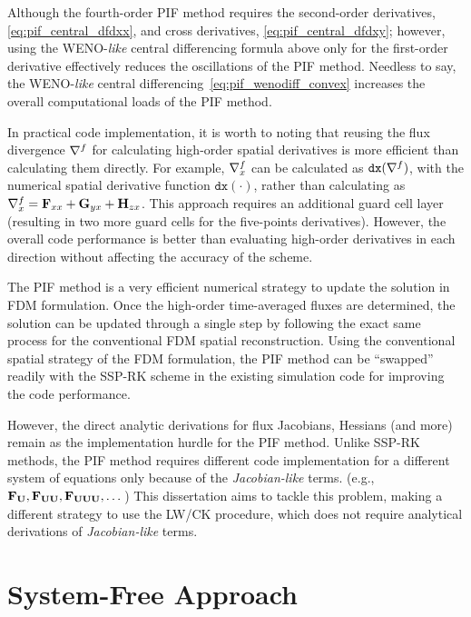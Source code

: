 Although the fourth-order PIF method requires the second-order derivatives, \cref{eq:pif_central_dfdxx},
and cross derivatives, \cref{eq:pif_central_dfdxy}; however, using the WENO-\textit{like}
central differencing formula above only for the first-order derivative
effectively reduces the oscillations of the PIF method.
Needless to say, the WENO-\textit{like} central differencing~\cref{eq:pif_wenodiff_convex}
increases the overall computational loads of the PIF method.

In practical code implementation, it is worth to noting that reusing the flux divergence \( \nabla^{f} \)
for calculating high-order spatial derivatives is more efficient than calculating them directly.
For example, \( \nabla^{f}_{x} \) can be calculated as \( \texttt{dx}(\nabla^{f}) \),
with the numerical spatial derivative function \( \texttt{dx}(\cdot) \),
rather than calculating as \( \nabla^{f}_{x} = \mathbf{F}_{xx} + \mathbf{G}_{yx}+ \mathbf{H}_{zx} \).
This approach requires an additional guard cell layer
(resulting in two more guard cells for the five-points derivatives).
However, the overall code performance is better than
evaluating high-order derivatives in each direction without affecting the accuracy of the scheme.

The PIF method is a very efficient numerical strategy to update the solution in FDM formulation.
Once the high-order time-averaged fluxes are determined, the solution can be updated
through a single step by following the exact same process for the conventional FDM spatial reconstruction.
Using the conventional spatial strategy of the FDM formulation,
the PIF method can be ``swapped'' readily with the SSP-RK scheme
in the existing simulation code for improving the code performance.

However, the direct analytic derivations for flux Jacobians, Hessians (and more)
remain as the implementation hurdle for the PIF method.
Unlike SSP-RK methods, the PIF method requires different code implementation
for a different system of equations only because of the \textit{Jacobian-like} terms. (e.g., \( \mathbf{F}_{\mathbf{U}}, \mathbf{F}_{\mathbf{U}\mathbf{U}}, \mathbf{F}_{\mathbf{U}\mathbf{U}\mathbf{U}}, \dots \))
This dissertation aims to tackle this problem,
making a different strategy to use the LW/CK procedure,
which does not require analytical derivations of \textit{Jacobian-like} terms.



\section{System-Free Approach}\label{sec:original_sf}

